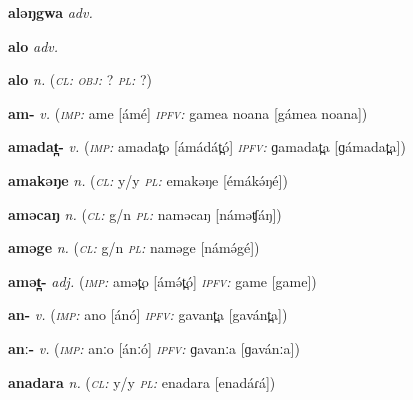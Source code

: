 \newentry
\headword\textbf{aləŋgwa}
\ipa{[álə́ŋgwá]}
\synpos\textit{adv.} 

\newentry
\headword\textbf{alo} 
\ipa{[alo]} 
\synpos\textit{adv.} 

\newentry
\headword\textbf{alo} 
\ipa{[alo]} 
\synpos\textit{n.} 
\class(\textit{\textsc{cl:}} {}
\object\textit{\textsc{obj:}} ?
\plural\textit{\textsc{pl:}} ?)

\newentry
\headword\textbf{am-}
\ipa{[ám-]}
\synpos\textit{v.} 
\imperative(\textit {\textsc{imp:}} ame [ámé] 
\imperfective\textit{\textsc{ipfv:}} gamea noana [gámea noana])

\newentry
\headword\textbf{amadat̪-}
\ipa{[ámádát̪-]}
\synpos\textit{v.} 
\imperative(\textit {\textsc{imp:}} amadat̪o [ámádát̪ó] 
\imperfective\textit{\textsc{ipfv:}} ɡamadat̪a [ɡámadat̪a])

\newentry
\headword\textbf{amakəŋe}
\ipa{[ámákə́ŋé]}
\synpos\textit{n.} 
\class(\textit{\textsc{cl:}} {y/y}
\plural\textit{\textsc{pl:}} emakəŋe [émákə́ŋé])

\newentry
\headword\textbf{aməcaŋ}
\ipa{[ámə́ʧáŋ]}
\synpos\textit{n.} 
\class(\textit{\textsc{cl:}} {g/n}
\plural\textit{\textsc{pl:}} naməcaŋ [náməʧáŋ])

\newentry
\headword\textbf{aməge}
\ipa{[ámə́gé]}
\synpos\textit{n.} 
\class(\textit{\textsc{cl:}} {g/n}
\plural\textit{\textsc{pl:}} naməge [námə́gé])

\newentry
\headword\textbf{amət̪-}
\ipa{[ámə́t̪-]}
\synpos\textit{adj.} 
\imperative(\textit {\textsc{imp:}} amət̪o [ámə́t̪ó] 
\imperfective\textit{\textsc{ipfv:}} game [game])

\newentry
\headword\textbf{an-}
\ipa{[án-]}
\synpos\textit{v.} 
\imperative(\textit {\textsc{imp:}} ano [ánó] 
\imperfective\textit{\textsc{ipfv:}} gavant̪a [gavánt̪a])

\newentry
\headword\textbf{anː-}
\ipa{[ánː-]}
\synpos\textit{v.} 
\imperative(\textit {\textsc{imp:}} anːo [ánːó] 
\imperfective\textit{\textsc{ipfv:}} ɡavanːa [ɡavánːa])

\newentry
\headword\textbf{anadara}
\ipa{[anadáɾá]}
\synpos\textit{n.} 
\class(\textit{\textsc{cl:}} {y/y}
\plural\textit{\textsc{pl:}} enadara [enadáɾá])

